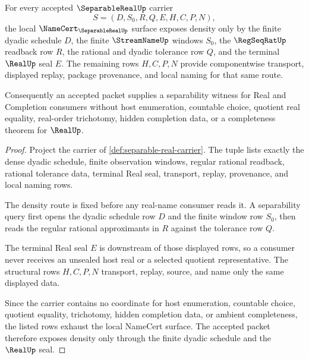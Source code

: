 \begin{theorem}
\label{thm:separable-real-dyadic-density-namecert}
For every accepted $\SeparableRealUp$ carrier
$$
S=(D,S_0,R,Q,E,H,C,P,N),
$$
the local $\NameCert_{\SeparableRealUp}$ surface exposes density only by the finite dyadic schedule $D$, the finite $\StreamNameUp$ windows $S_0$, the $\RegSeqRatUp$ readback row $R$, the rational and dyadic tolerance row $Q$, and the terminal $\RealUp$ seal $E$. The remaining rows $H,C,P,N$ provide componentwise transport, displayed replay, package provenance, and local naming for that same route.

Consequently an accepted packet supplies a separability witness for Real and Completion consumers without host enumeration, countable choice, quotient real equality, real-order trichotomy, hidden completion data, or a completeness theorem for $\RealUp$.
\end{theorem}
\begin{proof}
Project the carrier of \autoref{def:separable-real-carrier}. The tuple lists exactly the dense dyadic schedule, finite observation windows, regular rational readback, rational tolerance data, terminal Real seal, transport, replay, provenance, and local naming rows.

The density route is fixed before any real-name consumer reads it. A separability query first opens the dyadic schedule row $D$ and the finite window row $S_0$, then reads the regular rational approximants in $R$ against the tolerance row $Q$.

The terminal Real seal $E$ is downstream of those displayed rows, so a consumer never receives an unsealed host real or a selected quotient representative. The structural rows $H,C,P,N$ transport, replay, source, and name only the same displayed data.

Since the carrier contains no coordinate for host enumeration, countable choice, quotient equality, trichotomy, hidden completion data, or ambient completeness, the listed rows exhaust the local NameCert surface. The accepted packet therefore exposes density only through the finite dyadic schedule and the $\RealUp$ seal.
\end{proof}



